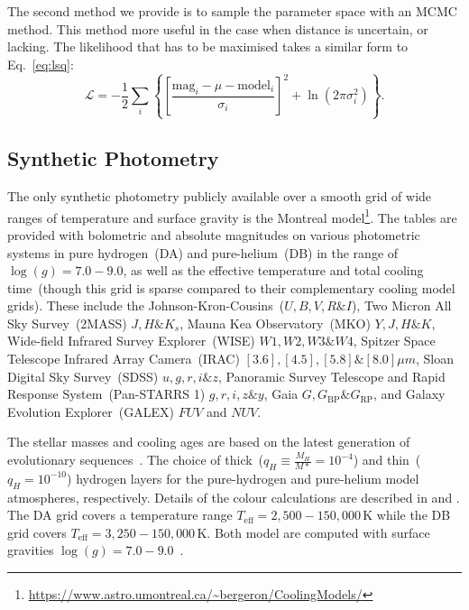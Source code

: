 \documentclass[fleqn,usenatbib]{rasti}
\begin{document}
The second method we provide is to sample the parameter space with an MCMC
method. This method more useful in the case when distance is uncertain, or
lacking. The likelihood that has to be maximised takes a similar form to
Eq.~\ref{eq:lsq}:
\begin{equation}
    \label{eq:likelihood}
    \mathcal{L} = -\dfrac{1}{2} \sum_{i} \left\{ \left[ \dfrac{\mathrm{mag}_i - \mu - \mathrm{model}_i}{\sigma_i} \right]^2 + \ln(2\pi\sigma_i^2) \right\}.
\end{equation}


\subsection*{Synthetic Photometry}
The only synthetic photometry publicly available over a smooth grid of wide
ranges of temperature and surface gravity is the Montreal
model\footnote{\url{https://www.astro.umontreal.ca/~bergeron/CoolingModels/}}.
The tables are provided with bolometric and absolute magnitudes on various
photometric systems in pure hydrogen~(DA) and pure-helium~(DB) in the range of
$\log(g)=7.0 - 9.0$, as well as the effective temperature and total cooling
time~(though this grid is sparse compared to their complementary cooling model
grids). These include the Johnson-Kron-Cousins~($U, B, V, R \& I$),
Two Micron All Sky Survey~(2MASS) $J, H \& K_{s}$, Mauna Kea Observatory~(MKO)
$Y, J, H \& K$, Wide-field Infrared Survey Explorer~(WISE) $W1, W2, W3 \& W4$,
Spitzer Space Telescope Infrared Array Camera~(IRAC)
$[3.6], [4.5], [5.8] \& [8.0] \mu m$, Sloan Digital Sky Survey~(SDSS)
$u, g, r, i \& z$, Panoramic Survey Telescope and Rapid Response
System~(Pan-STARRS 1) $g, r, i, z \& y$,
Gaia $G, G_{\mathrm{BP}} \& G_{\mathrm{RP}}$, and Galaxy Evolution
Explorer~(GALEX) $FUV$ and $NUV$.

The stellar masses and cooling ages are based on the latest generation of
evolutionary sequences~\citep{2020ApJ...901...93B}. The choice of
thick~($q_H \equiv \frac{M_H}{M*} = 10^{-4}$) and thin~($q_H = 10^{-10}$)
hydrogen layers for the pure-hydrogen and pure-helium model atmospheres,
respectively. Details of the colour calculations are described in
\citet{1995PASP..107.1047B} and \citet{2006AJ....132.1221H}. The DA grid covers
a temperature range $T_{\mathrm{eff}} = 2,500 - 150,000$\,K while the DB grid
covers $T_{\mathrm{eff}} = 3,250 - 150,000$\,K. Both model are computed with
surface gravities $\log(g) = 7.0 - 9.0$~\citep{2018ApJ...863..184B,
2020ApJ...901...93B, 2011ApJ...730..128T, 2011ApJ...737...28B, 2006ApJ...651L.137K}.
\end{document}

